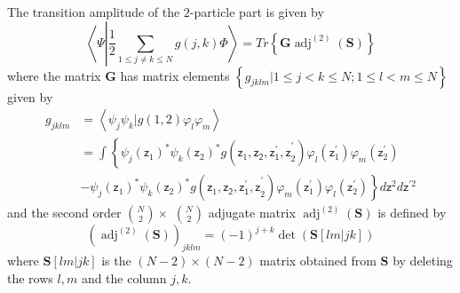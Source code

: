 \documentclass[aps,preprint]{revtex4}%
\begin{document}
The transition amplitude of the $2$-particle part is given by
\begin{equation}
\left\langle \Psi\left\vert \frac{1}{2}%
{\displaystyle\sum\limits_{1\leq j\neq k\leq N}}
g\left(  j,k\right)  \right.  \Phi\right\rangle =Tr\left\{  \mathbf{G}%
\operatorname{adj}^{\left(  2\right)  }\left(  \mathbf{S}\right)  \right\}
\end{equation}
where the matrix $\mathbf{G}$ has matrix elements $\left\{  g_{jklm}|1\leq
j<k\leq N;1\leq l<m\leq N\right\}  $ given by
\begin{align}
g_{jklm}  &  =\left\langle \psi_{j}\psi_{k}|g\left(  1,2\right)  \varphi
_{l}\varphi_{m}\right\rangle \nonumber\\
&  =%
{\displaystyle\int}
\left\{  \psi_{j}\left(  \mathsf{z}_{1}\right)  ^{\ast}\psi_{k}\left(
\mathsf{z}_{2}\right)  ^{\ast}g\left(  \mathsf{z}_{1}\mathsf{,\mathsf{z}%
_{2},\mathsf{z}_{1}^{\prime},z}_{2}^{\prime}\right)  \varphi_{l}\left(
\mathsf{z}_{1}^{\prime}\right)  \varphi_{m}\left(  \mathsf{z}_{2}^{\prime
}\right)  \right. \nonumber\\
&  \left.  -\psi_{j}\left(  \mathsf{z}_{1}\right)  ^{\ast}\psi_{k}\left(
\mathsf{z}_{2}\right)  ^{\ast}g\left(  \mathsf{z}_{1}\mathsf{,\mathsf{z}%
_{2},\mathsf{z}_{1}^{\prime},z}_{2}^{\prime}\right)  \varphi_{m}\left(
\mathsf{z}_{1}^{\prime}\right)  \varphi_{l}\left(  \mathsf{z}_{2}^{\prime
}\right)  \right\}  d\mathsf{z}^{2}d\mathsf{z}^{\prime2}%
\end{align}
and the second order $\binom{N}{2}\times$ $\binom{N}{2}$ adjugate matrix
$\operatorname{adj}^{\left(  2\right)  }\left(  \mathbf{S}\right)  $ is
defined by
\begin{equation}
\left(  \operatorname{adj}^{\left(  2\right)  }\left(  \mathbf{S}\right)
\right)  _{jklm}=\left(  -1\right)  ^{j+k}\det\left(  \mathbf{S}\left[
lm|jk\right]  \right)
\end{equation}
where $\mathbf{S}\left[  lm|jk\right]  $ is the $\left(  N-2\right)
\times\left(  N-2\right)  $ matrix obtained from $\mathbf{S}$ by deleting the
rows $l,m$ and the column $j,k$.
\end{document}
